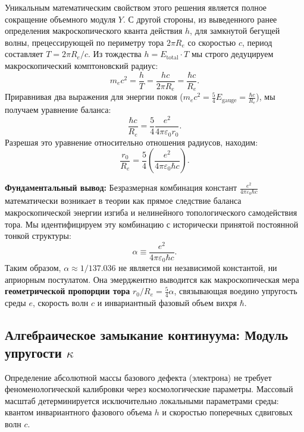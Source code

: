 \documentclass[11pt,a4paper]{article}
\begin{document}
	Уникальным математическим свойством этого решения является полное сокращение объемного модуля $Y$. 
	С другой стороны, из выведенного ранее определения макроскопического кванта действия $h$, для замкнутой бегущей волны, прецессирующей по периметру тора $2\pi R_e$ со скоростью $c$, период составляет $T = 2\pi R_e/c$. Из тождества $h = E_{\text{total}} \cdot T$ мы строго дедуцируем макроскопический комптоновский радиус:
	\begin{equation}
		m_e c^2 = \frac{h}{T} = \frac{h c}{2\pi R_e} = \frac{\hbar c}{R_e}.
	\end{equation}
	Приравнивая два выражения для энергии покоя ($m_e c^2 = \frac{5}{4} E_{\text{gauge}} = \frac{\hbar c}{R_e}$), мы получаем уравнение баланса:
	\begin{equation}
		\frac{\hbar c}{R_e} = \frac{5}{4} \frac{e^2}{4\pi\varepsilon_0 r_0}.
	\end{equation}
	Разрешая это уравнение относительно отношения радиусов, находим:
	\begin{equation}
		\frac{r_0}{R_e} = \frac{5}{4} \left( \frac{e^2}{4\pi\varepsilon_0 \hbar c} \right).
		\label{alpha_derivation}
	\end{equation}
	
	\textbf{Фундаментальный вывод:} Безразмерная комбинация констант $\frac{e^2}{4\pi\varepsilon_0 \hbar c}$ математически возникает в теории как прямое следствие баланса макроскопической энергии изгиба и нелинейного топологического самодействия тора. 
	Мы идентифицируем эту комбинацию с исторически принятой постоянной тонкой структуры:
	\begin{equation}
		\alpha \equiv \frac{e^2}{4\pi\varepsilon_0 \hbar c}.
	\end{equation}
	Таким образом, $\alpha \approx 1/137.036$ не является ни независимой константой, ни априорным постулатом. Она эмерджентно выводится как макроскопическая мера \textbf{геометрической пропорции тора} $r_0/R_e = \frac{5}{4}\alpha$, связывающая воедино упругость среды $e$, скорость волн $c$ и инвариантный фазовый объем вихря $\hbar$.
	
	\subsection{Алгебраическое замыкание континуума: Модуль упругости $\kappa$}
	Определение абсолютной массы базового дефекта (электрона) не требует феноменологической калибровки через космологические параметры. Массовый масштаб детерминируется исключительно локальными параметрами среды: квантом инвариантного фазового объема $h$ и скоростью поперечных сдвиговых волн $c$.
	
\end{document}
